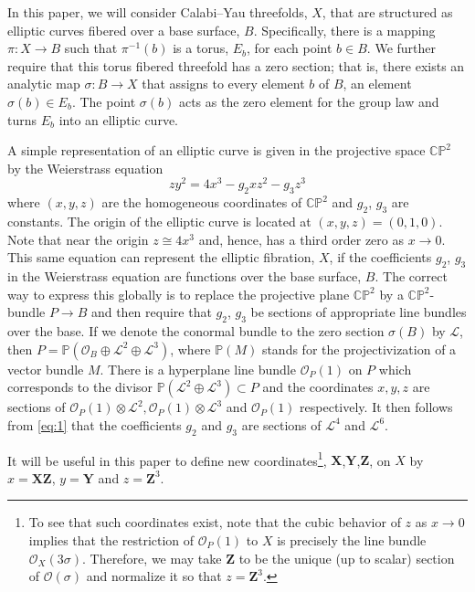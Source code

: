 \documentclass[a4paper,12pt]{article}
\numberwithin{equation}{section}
\newcommand{\cp}[1]{{\mathbb C}{\mathbb P}^{#1}}
\newcommand{\bX}{{\mathbf X}}
\newcommand{\bY}{{\mathbf Y}}
\newcommand{\bZ}{{\mathbf Z}}
\def\cL{{\mathcal L}}
\def\cO{{\mathcal O}}
\theoremstyle{plain}
\begin{document}

In this paper, we will consider Calabi--Yau threefolds, $X$, that are 
structured as elliptic curves fibered over a base surface,
$B$. Specifically,  there is a mapping
$\pi: X\to B$ such that $\pi^{-1}(b)$ is a torus, 
$E_b$, for each point $b \in B$. We further require that 
this torus fibered threefold has a zero section; that is, there 
exists an analytic map $\sigma : B\to X$ that assigns to 
every element $b$ of $B$, an element $\sigma(b) \in E_b$. The
point $\sigma(b)$ acts as the zero element for the group law 
and turns $E_b$ into an elliptic curve.

A simple representation of an elliptic curve is given in the 
projective space $\cp{2}$ by the Weierstrass equation
\begin{equation}
zy^2=4x^3-g_2xz^2-g_3z^3
\label{eq:1}
\end{equation}  
where $(x,y,z)$ are the homogeneous coordinates of $\cp{2}$ and $g_2$,
$g_3$ are constants. The origin of the elliptic curve is located at
$(x,y,z)=(0,1,0)$. Note that near the origin $z \cong 4x^3$ and,
hence, has a third order zero as $x \longrightarrow 0$. 
This same equation can represent the elliptic 
fibration, $X$, if the coefficients $g_2$, $g_3$ in the Weierstrass equation
are functions over the base surface, $B$. The correct way to express this 
globally is to replace the projective plane 
$\cp{2}$ by a $\cp{2}$-bundle $P \to B$ and then
require that $g_2$, $g_3$ be sections of appropriate line
bundles over the base. If we denote the conormal bundle to the 
zero section $\sigma(B)$ by $\cL$, then $P = {\mathbb P}({\mathcal
O}_{B}\oplus \cL^{2} \oplus \cL^{3})$, where ${\mathbb P}(M)$ stands
for the projectivization of a vector bundle $M$. There is a hyperplane line
bundle ${\mathcal O}_{P}(1)$ on $P$ which corresponds to the divisor 
${\mathbb P}(\cL^{2}\oplus \cL^{3}) \subset P$ and the
coordinates $x,y,z$ are sections of
$\cO_{P}(1)\otimes\cL^2, \cO_{P}(1)\otimes
\cL^3$ and $\cO_{P}(1)$ respectively. 
It then follows from \eqref{eq:1} that the coefficients $g_2$ and $g_3$ are 
sections of $\cL^4$ and $ \cL^6$.

It will be useful in this paper to define new coordinates\footnote{To see that 
such coordinates exist, note that the cubic behavior of $z$ as $x \to
0$ implies that the restriction of ${\mathcal O}_{P}(1)$ to $X$ is
precisely the line bundle $\cO_{X}(3\sigma)$. Therefore, we may take $\bZ$ to
be the unique (up to scalar) section of ${\mathcal O}(\sigma)$ and
normalize it so that $z = \bZ^{3}$.}, $\bX$,$\bY$,$\bZ$, 
on $X$ by $x=\bX\bZ$, $y=\bY$ and $z=\bZ^3$. 
\end{document}
